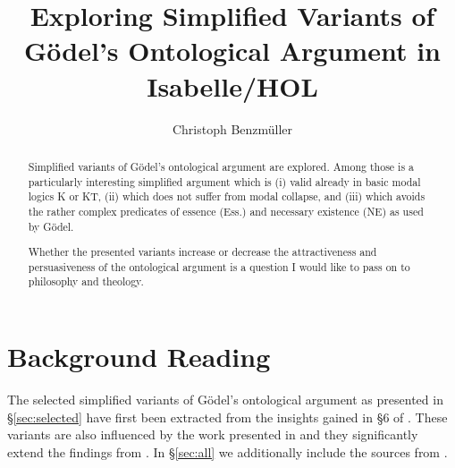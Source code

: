 \documentclass[11pt,a4paper]{article}
\begin{document}
\title{Exploring Simplified Variants of Gödel's Ontological Argument in Isabelle/HOL}
\author{Christoph Benzm\"uller}
\maketitle

\begin{abstract}
  Simplified variants of Gödel's ontological argument are
  explored. Among those is a particularly interesting simplified
  argument which is (i) valid already in basic
  modal logics K or KT, (ii) which does not suffer from modal collapse,
  and (iii) which avoids the rather complex predicates of essence (Ess.)
  and necessary existence (NE) as used by Gödel.

  Whether the presented variants increase or decrease the
  attractiveness and persuasiveness of the ontological argument is a
  question I would like to pass on to philosophy and theology.
\end{abstract}

\tableofcontents

\section{Background Reading}
The selected simplified variants of Gödel's ontological argument
\cite{GoedelNotes,ScottNotes} as presented in \S\ref{sec:selected} have first been
extracted from the insights gained in \S6 of \cite{C85}. These variants are also influenced by the work
presented in \cite{J52} and they significantly extend the findings
from \cite{J28}. In \S\ref{sec:all} we additionally include the
sources from \cite{C85}.






\end{document}
